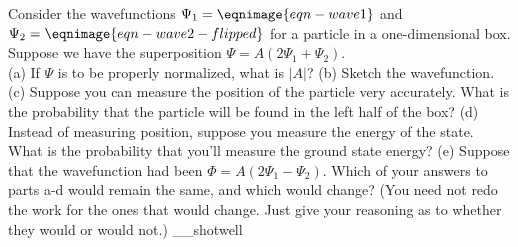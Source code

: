Consider the wavefunctions $\Psi_1=\eqnimage{eqn-wave1}$ and $\Psi_2=\eqnimage{eqn-wave2-flipped}$ for a particle in
a one-dimensional box. Suppose we have the superposition
$\Psi=A(2\Psi_1+\Psi_2)$.\\
(a) If $\Psi$ is to be properly normalized, what is $|A|$?\answercheck\hwendpart
(b) Sketch the wavefunction.\hwendpart
(c) Suppose you can measure the position of the particle very accurately.  What is the probability
that the particle will be found in the left half of the box?\answercheck\hwendpart
(d) Instead of measuring position, suppose you measure the energy of the state. What is the probability
that you'll measure the ground state energy?\answercheck\hwendpart
(e) Suppose that the wavefunction had been $\Phi=A(2\Psi_1-\Psi_2)$. Which of your
answers to parts a-d would remain the same, and which would change? (You need not redo the work
for the ones that would change. Just give your reasoning as to whether they would or would not.)
__shotwell

